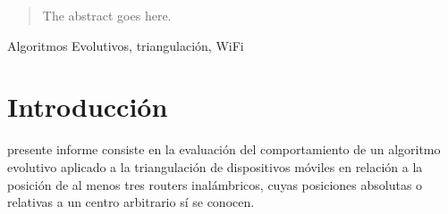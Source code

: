 \documentclass[journal]{IEEEtran}
\begin{document}




\maketitle


\begin{abstract}
The abstract goes here.
\end{abstract}

\begin{IEEEkeywords}
Algoritmos Evolutivos, triangulación, WiFi
\end{IEEEkeywords}






%
\IEEEpeerreviewmaketitle


\section{Introducción}
% 
% 
% 
% 
 presente informe consiste en la evaluación del comportamiento de un algoritmo evolutivo aplicado a la triangulación de dispositivos móviles en relación a la posición de al menos tres routers inalámbricos, cuyas posiciones absolutas o relativas a un centro arbitrario sí se conocen.\\
\end{document}
